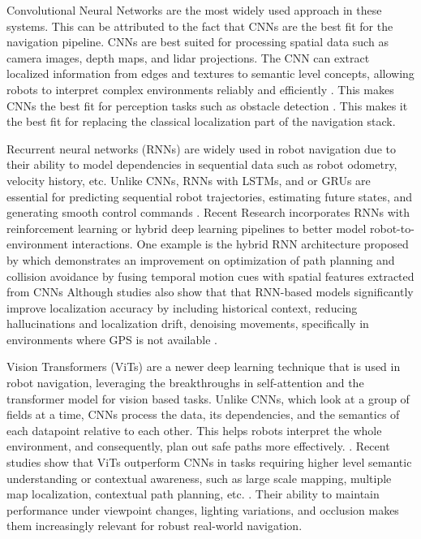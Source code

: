 Convolutional Neural Networks are the most widely used approach in these systems. This can be attributed to the fact that CNNs are the best fit for the navigation pipeline. CNNs are best suited for processing spatial data such as camera images, depth maps, and lidar projections. The CNN can extract localized information from edges and textures to semantic level concepts, allowing robots to interpret complex environments reliably and efficiently \citep{LeCun2015DeepLearningNature}. This makes CNNs the best fit for perception tasks such as obstacle detection \citep{Eigen2014DepthSingleImage, Ronneberger2015UNet, Redmon2016YOLO}. This makes it the best fit for replacing the classical localization part of the navigation stack.

Recurrent neural networks (RNNs) are widely used in robot navigation due to their ability to model dependencies in sequential data such as robot odometry, velocity history, etc. Unlike CNNs, RNNs with LSTMs, and or GRUs are essential for predicting sequential robot trajectories, estimating future states, and generating smooth control commands \citep{Hochreiter1997LSTM, Cho2014RNNEncoderDecoder}. Recent Research incorporates RNNs with reinforcement learning or hybrid deep learning pipelines to better model robot-to-environment interactions. One example is the hybrid RNN architecture proposed by \cite{Radha2025HybridRNNNavigation} which demonstrates an improvement on optimization of path planning and collision avoidance by fusing temporal motion cues with spatial features extracted from CNNs Although studies also show that that RNN-based models significantly improve localization accuracy by including historical context, reducing hallucinations and localization drift, denoising movements, specifically in environments where GPS is not available \citep{Ichter2018LearningSamplingDistributions, Weng2019MotionForecastingRNN}.

Vision Transformers (ViTs) are a newer deep learning technique that is used in robot navigation, leveraging the breakthroughs in self-attention and the transformer model for vision based tasks. Unlike CNNs, which look at a group of fields at a time, CNNs process the data, its dependencies, and the semantics of each datapoint relative to each other. This helps robots interpret the whole environment, and consequently, plan out safe paths more effectively. \citep{Dosovitskiy2021ViT, Khan2022TransformersVisionSurvey}. Recent studies show that ViTs outperform CNNs in tasks requiring higher level semantic understanding or contextual awareness, such as large scale mapping, multiple map localization, contextual path planning, etc. \citep{Chen2021TransTrack}. Their ability to maintain performance under viewpoint changes, lighting variations, and occlusion makes them increasingly relevant for robust real-world navigation.

